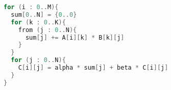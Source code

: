 \documentclass{standalone}
\begin{document}
\begin{minipage}[]{0.8\linewidth}
    \begin{lstlisting}[language=C, basicstyle=\ttfamily]
for (i : 0..M){
  sum[0..N] = {0..0}
  for (k : 0..K){
    from (j : 0..N){
      sum[j] += A[i][k] * B[k][j]
    }
  }
  for (j : 0..N){
    C[i][j] = alpha * sum[j] + beta * C[i][j]
  }
}
        \end{lstlisting}\label{alg:rowWiseMatMul}
\end{minipage}
\end{document}
